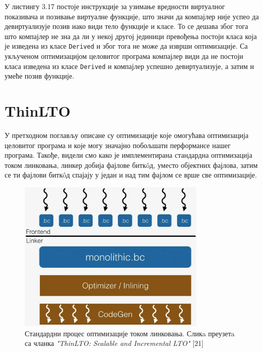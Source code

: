 \documentclass[12pt,oneside]{memoir}
\begin{document}
У листингу 3.17 постоје инструкције за узимање вредности
виртуалног показивача и позивање виртуалне функције, што значи да компајлер није успео
да девиртуализује позив иако види тело функције и класе.
То се дешава због тога што компајлер не зна да ли у некој другој јединици превођења
постоји класа која је изведена из класе \texttt{Derived} и због тога не може да изврши
оптимизације.
Са укљученом оптимизацијом целовитог програма компајлер види да не постоји класа
изведена из класе \texttt{Derived} и компајлер успешно девиртуализује, а затим и умеће
позив функције. 
 
 \chapter{ThinLTO}
 
 У претходном поглављу описане су оптимизације које омогућава оптимизација целовитог програма и које могу  значајно
 побољшати перформансе нашег програма.
 Такође, видели смо како је имплементирана стандардна оптимизација током линковања,
  линкер добија фајлове битк\^{o}д, уместо објектних фајлова, затим се ти
фајлови битк\^{o}д спајају у један и над тим фајлом се врше све оптимизације.
 
\begin{figure}[!ht]
  \centering
  \includegraphics[width=0.8\textwidth]{LTO_normal.png}
  \caption{Стандардни процес оптимизације током линковања. Сликa преузетa са чланка \textit{"ThinLTO: Scalable and Incremental LTO"} [21]}
  \label{fig:grafikon}
\end{figure}
\end{document}
